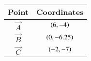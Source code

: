 \begin{tabular}{ |c| c|}
    \hline
    \textbf{Point}  & \textbf{Coordinates}\\
    \hline
    $\vec{A}$ & $\left(6,-4\right)$ \\
    \hline
    $\vec{B}$ & $\left(0,-6.25\right)$\\
    \hline
    $\vec{C}$ & $\left(-2,-7\right)$\\
    \hline
\end{tabular}
